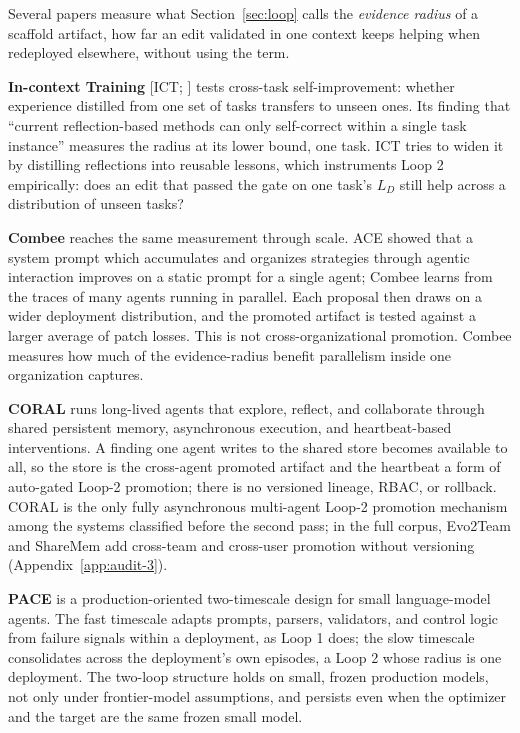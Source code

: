 \documentclass[
  11pt,
]{article}
\begin{document}
Several papers measure what Section~\ref{sec:loop} calls the \emph{evidence radius} of a scaffold artifact, how far an edit validated in one context keeps helping when redeployed elsewhere, without using the term.

\textbf{In-context Training} {[}ICT; \cite{shalev2026ict}{]} tests cross-task self-improvement: whether experience distilled from one set of tasks transfers to unseen ones. Its finding that ``current reflection-based methods can only self-correct within a single task instance'' measures the radius at its lower bound, one task. ICT tries to widen it by distilling reflections into reusable lessons, which instruments Loop 2 empirically: does an edit that passed the gate on one task's \(L_D\) still help across a distribution of unseen tasks?

\textbf{Combee} \cite{li2026combee} reaches the same measurement through scale. ACE \cite{ace2025agentic} showed that a system prompt which accumulates and organizes strategies through agentic interaction improves on a static prompt for a single agent; Combee learns from the traces of many agents running in parallel. Each proposal then draws on a wider deployment distribution, and the promoted artifact is tested against a larger average of patch losses. This is not cross-organizational promotion. Combee measures how much of the evidence-radius benefit parallelism inside one organization captures.

\textbf{CORAL} \cite{qu2026coral} runs long-lived agents that explore, reflect, and collaborate through shared persistent memory, asynchronous execution, and heartbeat-based interventions. A finding one agent writes to the shared store becomes available to all, so the store is the cross-agent promoted artifact and the heartbeat a form of auto-gated Loop-2 promotion; there is no versioned lineage, RBAC, or rollback. CORAL is the only fully asynchronous multi-agent Loop-2 promotion mechanism among the systems classified before the second pass; in the full corpus, Evo2Team and ShareMem add cross-team and cross-user promotion without versioning (Appendix~\ref{app:audit-3}).

\textbf{PACE} \cite{ling2026pace} is a production-oriented two-timescale design for small language-model agents. The fast timescale adapts prompts, parsers, validators, and control logic from failure signals within a deployment, as Loop 1 does; the slow timescale consolidates across the deployment's own episodes, a Loop 2 whose radius is one deployment. The two-loop structure holds on small, frozen production models, not only under frontier-model assumptions, and persists even when the optimizer and the target are the same frozen small model.
\end{document}
